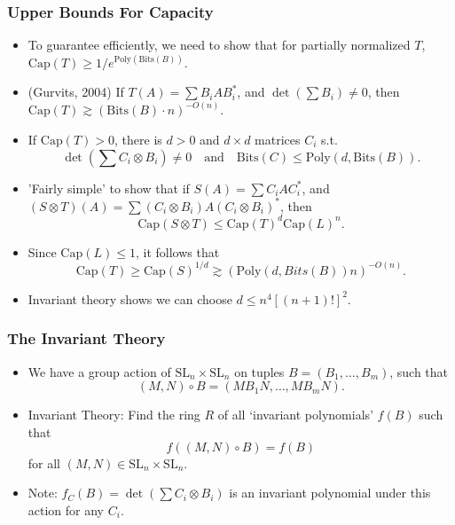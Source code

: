 \documentclass[handout,usenames,dvipsnames,12pt]{beamer}
\begin{document}
\begin{frame}

\frametitle{Upper Bounds For Capacity}

\begin{itemize}
    \pause
    \item To guarantee efficiently, we need to show that for partially normalized $T$, $\text{Cap}(T) \geq 1/e^{\text{Poly}(\text{Bits}(B))}$.

    \pause
    \item (Gurvits, 2004) If $T(A) = \sum B_i A B_i^*$, and $\det(\sum B_i) \neq 0$, then $\text{Cap}(T) \gtrsim (\text{Bits}(B) \cdot n)^{- O(n)}$.

    \pause
    \item If $\text{Cap}(T) > 0$, there is $d > 0$ and $d \times d$ matrices $C_i$ s.t.
    \[ \det(\sum C_i \otimes B_i) \neq 0 \quad\text{and}\quad \text{Bits}(C) \leq \text{Poly}(d,\text{Bits}(B)). \]

    \pause
    \item 'Fairly simple' to show that if $S(A) = \sum C_i A C_i^*$, and $(S \otimes T)(A) = \sum (C_i \otimes B_i) A (C_i \otimes B_i)^*$, then
    \[ \text{Cap}(S \otimes T) \leq \text{Cap}(T)^d \text{Cap}(L)^n. \]

    \pause
    \item Since $\text{Cap}(L) \leq 1$, it follows that
    \[ \text{Cap}(T) \geq \text{Cap}(S)^{1/d} \gtrsim (\text{Poly}(d, Bits(B)) n)^{-O(n)}. \]

    \pause
    \item Invariant theory shows we can choose $d \leq n^4 [(n+1)!]^2$.
\end{itemize}

\end{frame}








\begin{frame}

\frametitle{The Invariant Theory}

\begin{itemize}
    \pause
    \item We have a group action of $\text{SL}_n \times \text{SL}_n$ on tuples $B = (B_1,\dots,B_m)$, such that
    \[ (M,N) \circ B = (MB_1N, \dots, MB_mN). \]

    \pause
    \item Invariant Theory: Find the ring $R$ of all `invariant polynomials' $f(B)$ such that
    \[ f((M,N) \circ B) = f(B) \]
    for all $(M,N) \in \text{SL}_n \times \text{SL}_n$.

    \pause
    \item Note: $f_C(B) = \det(\sum C_i \otimes B_i)$ is an invariant polynomial under this action for any $C_i$.
\end{itemize}

\end{frame}
\end{document}

